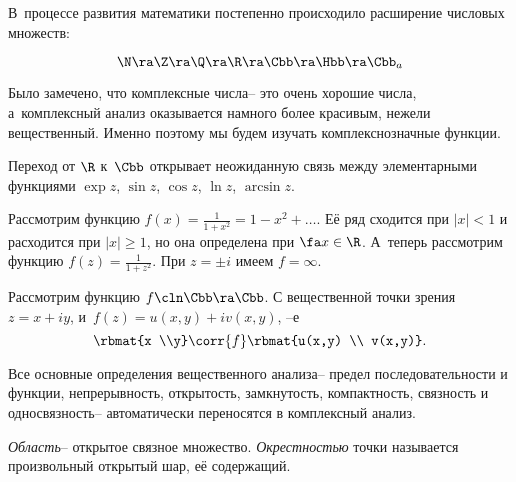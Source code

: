 \documentclass[a4paper]{article}
\begin{document}
В~процессе развития математики постепенно происходило расширение числовых множеств:

$$\N \ra \Z \ra \Q \ra \R \ra \Cbb \ra \Hbb \ra \Cbb_a$$

Было замечено, что комплексные числа-- это очень хорошие числа, а~комплексный анализ оказывается
намного более красивым, нежели вещественный. Именно поэтому мы будем изучать комплекснозначные функции.

Переход от $\R$ к~$\Cbb$ открывает неожиданную связь между элементарными функциями $\exp z$, $\sin z$, $\cos z$,
$\ln z$, $\arcsin z$.

Рассмотрим функцию $f(x) = \frac{1}{1+x^2} = 1 - x^2 + \ldots$. Её ряд сходится при $|x| < 1$ и расходится при
$|x| \ge 1$, но она определена при $\fa x \in \R$. А~теперь рассмотрим функцию $f(z) = \frac{1}{1+z^2}$. При
$z = \pm i$ имеем $f = \infty$.

Рассмотрим функцию $f\cln \Cbb \ra \Cbb$. С вещественной точки зрения $z = x + iy$,
и~$f(z) = u(x,y) + iv(x,y)$, --е $$\rbmat{x \\y} \corr{f} \rbmat{u(x,y) \\ v(x,y)}.$$

Все основные определения вещественного анализа-- предел последовательности и функции, непрерывность, открытость,
замкнутость, компактность, связность и односвязность-- автоматически переносятся в комплексный анализ.

\begin{df}
\emph{Область}-- открытое связное множество. \emph{Окрестностью} точки называется произвольный открытый шар, её содержащий.
\end{df}
\end{document}
